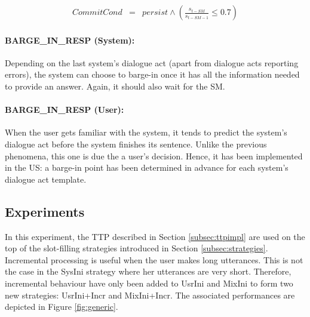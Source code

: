 					\begin{eqnarray}
						CommitCond & = & persist \wedge (\frac{s_{t-SM}}{s_{t-SM-1}} \leq 0.7) \nonumber
					\end{eqnarray}
         
         \paragraph{BARGE\_IN\_RESP (System):} Depending on the last system's dialogue act (apart from dialogue acts reporting errors), the system can choose to barge-in once it has all the information needed to provide an answer. Again, it should also wait for the SM.
         
         \paragraph{BARGE\_IN\_RESP (User):} When the user gets familiar with the system, it tends to predict the system's dialogue act before the system finishes its sentence. Unlike the previous phenomena, this one is due the a user's decision. Hence, it has been implemented in the US: a barge-in point has been determined in advance for each system's dialogue act template.
    
    \subsection{Experiments}
    
    	In this experiment, the TTP described in Section \ref{subsec:ttpimpl} are used on the top of the slot-filling strategies introduced in Section \ref{subsec:strategies}. Incremental processing is useful when the user makes long utterances. This is not the case in the SysIni strategy where her utterances are very short. Therefore, incremental behaviour have only been added to UsrIni and MixIni to form two new strategies: UsrIni+Incr and MixIni+Incr. The associated performances are depicted in Figure \ref{fig:generic}.

